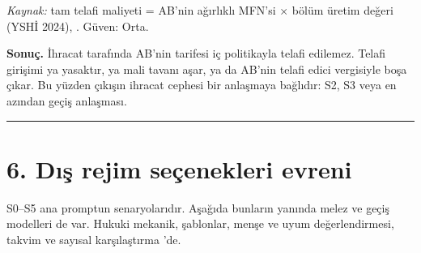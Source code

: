 \endgroup

\emph{Kaynak:} \etiketT{} tam telafi maliyeti = AB'nin ağırlıklı MFN'si × bölüm üretim değeri (YSHİ 2024), . Güven: Orta.

\textbf{Sonuç.} İhracat tarafında AB'nin tarifesi iç politikayla telafi edilemez. Telafi girişimi ya yasaktır, ya mali tavanı aşar, ya da AB'nin telafi edici vergisiyle boşa çıkar. Bu yüzden çıkışın ihracat cephesi bir anlaşmaya bağlıdır: S2, S3 veya en azından geçiş anlaşması.

\begin{center}\rule{0.5\linewidth}{0.5pt}\end{center}

\hypertarget{02a_politika_uzayi-6-dux131ux15f-rejim-seuxe7enekleri-evreni}{%
\section{6. Dış rejim seçenekleri evreni}\label{02a_politika_uzayi-6-dux131ux15f-rejim-seuxe7enekleri-evreni}}

S0--S5 ana promptun senaryolarıdır. Aşağıda bunların yanında melez ve geçiş modelleri de var. Hukuki mekanik, şablonlar, menşe ve uyum değerlendirmesi, takvim ve sayısal karşılaştırma 'de.

\begingroup\gbtablo\footnotesize

